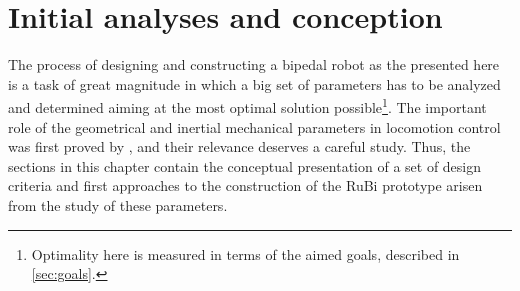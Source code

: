 \chapter{Initial analyses and conception} %
\label{cha:analysis}
The process of designing and constructing a bipedal robot as the presented here is a task of great magnitude in which a big set of parameters has to be analyzed and determined aiming at the most optimal solution possible\footnote{Optimality here is measured in terms of the aimed goals, described in \ref{sec:goals}.}.
The important role of the geometrical and inertial mechanical parameters in locomotion control was first proved by \cite{passive_walking}, and their relevance deserves a careful study.
Thus, the sections in this chapter contain the conceptual presentation of a set of design criteria and first approaches to the construction of the RuBi prototype arisen from the study of these parameters.






